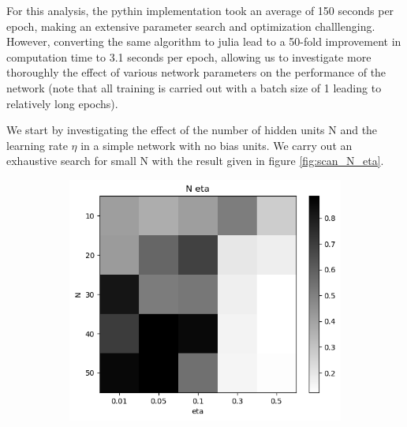 \documentclass{article}
\begin{document}
\newpage

For this analysis, the pythin implementation took an average of 150 seconds per epoch, making an extensive parameter search and optimization challlenging. However, converting the same algorithm to julia lead to a 50-fold improvement in computation time to 3.1 seconds per epoch, allowing us to investigate more thoroughly the effect of various network parameters on the performance of the network (note that all training is carried out with a batch size of 1 leading to relatively long epochs).

We start by investigating the effect of the number of hidden units N and the learning rate $\eta$ in a simple network with no bias units. We carry out an exhaustive search for small N with the result given in figure \ref{fig:scan_N_eta}.

\begin{figure}[h]
	\centering
	\begin{subfigure}[t]{0.42\linewidth}
		\centering
		\includegraphics[width = 1.0\linewidth, trim={0 0 0 0}, clip=true]{figures/scan_N_eta_perf.png}
	\end{subfigure}%
	\hspace{0.05 \linewidth}
	\begin{subfigure}[t]{0.42\linewidth}
		\centering

\end{subfigure}
\end{figure}
\end{document}
